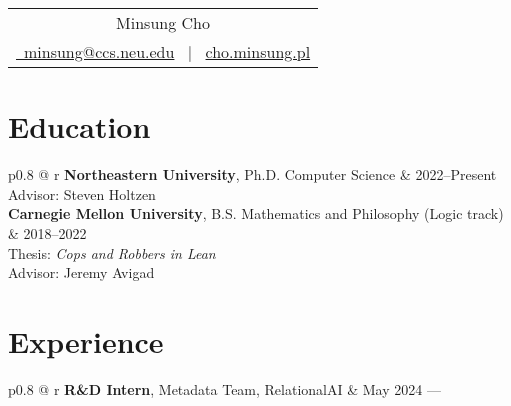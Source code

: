 \documentclass[12pt]{article}
\begin{document}
\pagestyle{empty}



\begin{tabularx}{\linewidth}{@{} C @{}}
\Huge{Minsung Cho} \\[7.5pt]
\href{mailto:minsung@ccs.neu.edu}{\raisebox{-0.05\height}\ minsung@ccs.neu.edu} \ $|$ \ \href{cho.minsung.pl}{cho.minsung.pl}
\end{tabularx}

\section{Education}
\begin{tabularx}{\linewidth}{ p{0.8\textwidth} @{\extracolsep{\fill}} r}
\textbf{Northeastern University}, Ph.D. Computer Science & \hfill 2022--Present \\
[3pt]
Advisor: Steven Holtzen\vspace{0.5em}\\
\textbf{Carnegie Mellon University}, B.S. Mathematics and Philosophy (Logic track) & \hfill 2018--2022 \\
[3pt]
Thesis: \textit{Cops and Robbers in Lean} \\
Advisor: Jeremy Avigad
\end{tabularx}

\section{Experience}

\begin{tabularx}{\linewidth}{p{0.8\textwidth} @{\extracolsep{\fill}} r}
  \textbf{R\&D Intern}, Metadata Team, RelationalAI & May 2024 --- \\
\end{tabularx}
\end{document}
